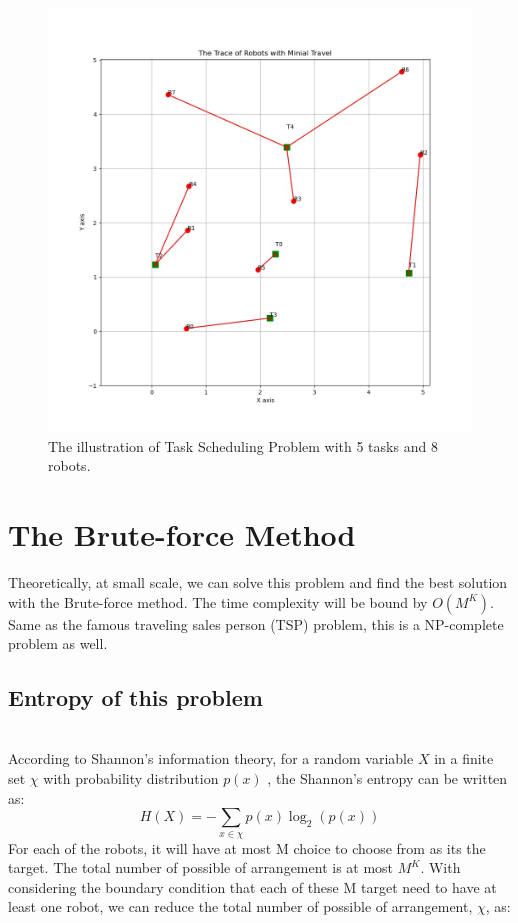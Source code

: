 \begin{figure}[h!]
  \centering
  \includegraphics[width=15cm]{Pictures/ProblemStatement.jpeg}
  \caption{The illustration of Task Scheduling Problem with 5 tasks and 8 robots.}
  \label{fig:birds}
  \Description{}
\end{figure}

\section{The Brute-force Method}
Theoretically, at small scale, we can solve this problem and find the best solution with the Brute-force method. The time complexity will be bound by $O(M^K)$. Same as the famous traveling sales person (TSP) problem, this is a NP-complete problem as well.
\subsection{Entropy of this problem}
\\ According to Shannon's information theory\cite{Shannon1948}, for a random variable $X$ in a finite set $\chi$ with probability distribution $p(x)$ , the  Shannon's entropy can be written as:
\begin{equation}
    H\left( X \right) =  - \sum\limits_{x \in \chi } {p\left( x \right){{\log }_2}\left( {p\left( x \right)} \right)}\label{shannon}
\end{equation}
For each of the robots, it will have at most M choice to choose from as its the target. The total number of possible of arrangement is at most $M^K$. With considering the boundary condition that each of these M target need to have at least one robot, we can reduce the total number of possible of arrangement, $\chi$, as: 

